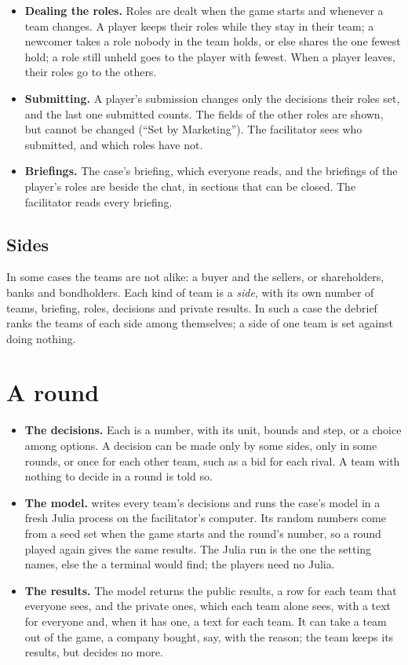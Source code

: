 \begin{itemize}
  \item \textbf{Dealing the roles.} Roles are dealt when the game starts and whenever a team changes. A player keeps
    their roles while they stay in their team; a newcomer takes a role nobody in the team holds, or else shares
    the one fewest hold; a role still unheld goes to the player with fewest. When a player leaves, their roles go
    to the others.
  \item \textbf{Submitting.} A player's submission changes only the decisions their roles set, and the last one
    submitted counts. The fields of the other roles are shown, but cannot be changed (``Set by Marketing''). The
    facilitator sees who submitted, and which roles have not.
  \item \textbf{Briefings.} The case's briefing, which everyone reads, and the briefings of the player's roles are
    beside the chat, in sections that can be closed. The facilitator reads every briefing.
\end{itemize}

\subsection{Sides}
In some cases the teams are not alike: a buyer and the sellers, or shareholders, banks and bondholders. Each kind
of team is a \emph{side}, with its own number of teams, briefing, roles, decisions and private results. In such a
case the debrief ranks the teams of each side among themselves; a side of one team is set against doing nothing.

\section{A round}\label{sec:round}
\begin{itemize}
  \item \textbf{The decisions.} Each is a number, with its unit, bounds and step, or a choice among options. A
    decision can be made only by some sides, only in some rounds, or once for each other team, such as a bid for
    each rival. A team with nothing to decide in a round is told so.
  \item \textbf{The model.}  writes every team's decisions and runs the case's model in a fresh Julia
    process on the facilitator's computer. Its random numbers come from a seed set when the game starts and the
    round's number, so a round played again gives the same results. The Julia run is the one the setting
     names, else the  a terminal would find; the players need no Julia.
  \item \textbf{The results.} The model returns the public results, a row for each team that everyone sees, and the
    private ones, which each team alone sees, with a text for everyone and, when it has one, a text for each team.
    It can take a team out of the game, a company bought, say, with the reason; the team keeps its results, but
    decides no more.
\end{itemize}

